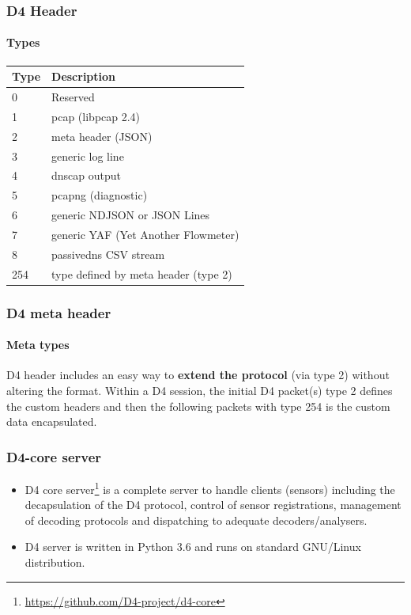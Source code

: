 \documentclass{beamer}
\begin{document}
\begin{frame}
    \frametitle{D4 Header}
    \framesubtitle{Types}
        \begin{tabular}{|l|l|}
            \hline
            Type &	Description\\
            \hline
            0 	& Reserved\\
            1 	& pcap (libpcap 2.4)\\
            2 	& meta header (JSON)\\
            3 	& generic log line\\
            4 	& dnscap output\\
            5 	& pcapng (diagnostic)\\
            6 	& generic NDJSON or JSON Lines\\
            7 	& generic YAF (Yet Another Flowmeter)\\
            8  	& passivedns CSV stream\\
            254 &	type defined by meta header (type 2)\\
            \hline
        \end{tabular}
\end{frame}

\begin{frame}
    \frametitle{D4 meta header}
    \framesubtitle{Meta types}
        D4 header includes an easy way to {\bf extend the protocol} (via type 2) without altering the format. Within a D4 session, the initial D4 packet(s) type 2 defines
        the custom headers and then the following packets with type 254 is the custom data encapsulated.
    \small
    
\end{frame}

\begin{frame}
    \frametitle{D4-core server}
   \begin{itemize}
           \item D4 core server\footnote{\url{https://github.com/D4-project/d4-core}} is a complete server to handle clients (sensors) including the decapsulation of the D4 protocol, control of sensor registrations, management of decoding protocols and dispatching to adequate decoders/analysers.
           \item D4 server is written in Python 3.6 and runs on standard GNU/Linux distribution.
   \end{itemize}
\end{frame}
\end{document}
